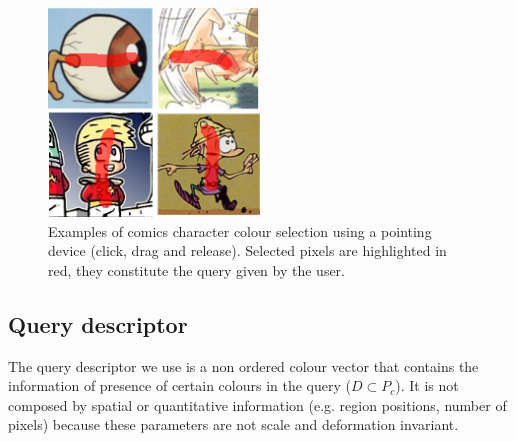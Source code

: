  \begin{figure}[!ht]	%
 	 \centering
 	\includegraphics[width=0.5\textwidth]{user_selection.png}
 	\caption[User defined comics character selection]{Examples of comics character colour selection using a pointing device (click, drag and release). Selected pixels are highlighted in red, they constitute the query given by the user.}
 	\label{fig:in:user_selection}
 \end{figure}

\subsection{Query descriptor}

The query descriptor we use is a non ordered colour vector that contains the information of presence of certain colours in the query ($D \subset P_c$). It is not composed by spatial or quantitative information (e.g. region positions, number of pixels) because these parameters are not scale and deformation invariant.%



